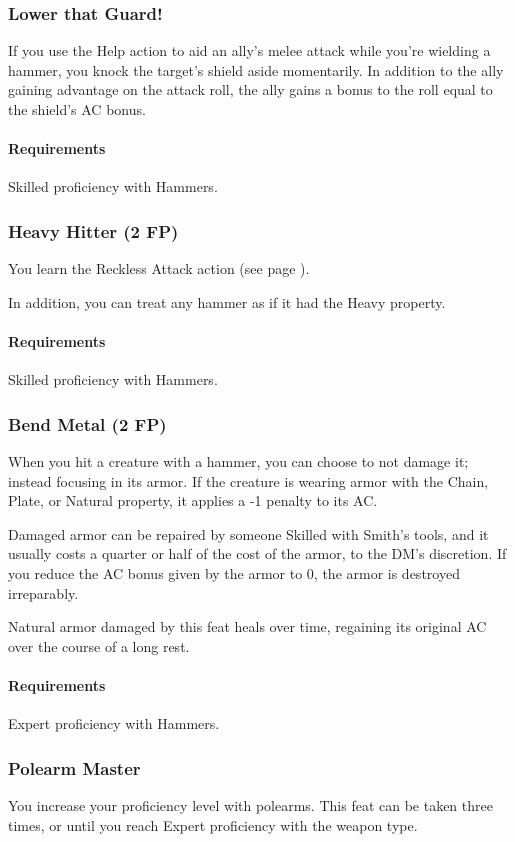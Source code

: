 \subsubsection{Lower that Guard!} \label{feat::lowerthatguard}
    If you use the Help action to aid an ally's melee attack while you're wielding a hammer, you knock the target's shield aside momentarily.
    In addition to the ally gaining advantage on the attack roll, the ally gains a bonus to the roll equal to the shield's AC bonus.
    \paragraph{Requirements} Skilled proficiency with Hammers.
\subsubsection{Heavy Hitter (2 FP)} \label{feat::heavyhitter}
    You learn the Reckless Attack action (see page \pageref{act::recklessattack}).

    In addition, you can treat any hammer as if it had the Heavy property.
    \paragraph{Requirements} Skilled proficiency with Hammers.
\subsubsection{Bend Metal (2 FP)} \label{feat::bendmetal}
    When you hit a creature with a hammer, you can choose to not damage it; instead focusing in its armor.
    If the creature is wearing armor with the Chain, Plate, or Natural property, it applies a -1 penalty to its AC.

    Damaged armor can be repaired by someone Skilled with Smith's tools, and it usually costs a quarter or half of the cost of the armor, to the DM's discretion.
    If you reduce the AC bonus given by the armor to 0, the armor is destroyed irreparably.

    Natural armor damaged by this feat heals over time, regaining its original AC over the course of a long rest.
    \paragraph{Requirements} Expert proficiency with Hammers.
\subsubsection{Polearm Master} \label{feat::polearmmaster}
    You increase your proficiency level with polearms.
    This feat can be taken three times, or until you reach Expert proficiency with the weapon type.
